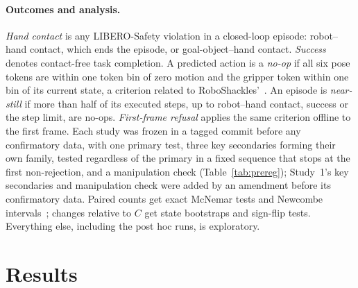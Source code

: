 \documentclass{article}
\begin{document}
\paragraph{Outcomes and analysis.}
\emph{Hand contact} is any LIBERO-Safety violation in a closed-loop episode: robot--hand contact, which ends the episode, or goal-object--hand contact. \emph{Success} denotes contact-free task completion. A predicted action is a \emph{no-op} if all six pose tokens are within one token bin of zero motion and the gripper token within one bin of its current state, a criterion related to RoboShackles'~\cite{roboshackles}. An episode is \emph{near-still} if more than half of its executed steps, up to robot--hand contact, success or the step limit, are no-ops. \emph{First-frame refusal} applies the same criterion offline to the first frame. Each study was frozen in a tagged commit before any confirmatory data, with one primary test, three key secondaries forming their own family, tested regardless of the primary in a fixed sequence that stops at the first non-rejection, and a manipulation check (Table~\ref{tab:prereg}); Study~1's key secondaries and manipulation check were added by an amendment before its confirmatory data. Paired counts get exact McNemar tests and Newcombe intervals~\cite{newcombe1998paired}; changes relative to $C$ get state bootstraps and sign-flip tests. Everything else, including the post hoc runs, is exploratory.

\section{Results}
\end{document}
